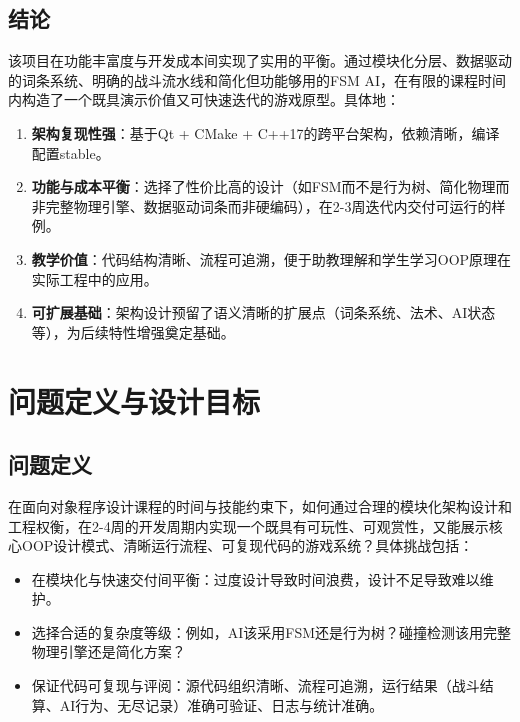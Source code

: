 ﻿\documentclass[utf8]{ctexart}
\begin{document}
\subsection{结论}

该项目在功能丰富度与开发成本间实现了实用的平衡。通过模块化分层、数据驱动的词条系统、明确的战斗流水线和简化但功能够用的FSM AI，在有限的课程时间内构造了一个既具演示价值又可快速迭代的游戏原型。具体地：

\begin{enumerate}
  \item \textbf{架构复现性强}：基于Qt + CMake + C++17的跨平台架构，依赖清晰，编译配置stable。

  \item \textbf{功能与成本平衡}：选择了性价比高的设计（如FSM而不是行为树、简化物理而非完整物理引擎、数据驱动词条而非硬编码），在2-3周迭代内交付可运行的样例。

  \item \textbf{教学价值}：代码结构清晰、流程可追溯，便于助教理解和学生学习OOP原理在实际工程中的应用。

  \item \textbf{可扩展基础}：架构设计预留了语义清晰的扩展点（词条系统、法术、AI状态等），为后续特性增强奠定基础。
\end{enumerate}

\section{问题定义与设计目标}

\subsection{问题定义}

在面向对象程序设计课程的时间与技能约束下，如何通过合理的模块化架构设计和工程权衡，在2-4周的开发周期内实现一个既具有可玩性、可观赏性，又能展示核心OOP设计模式、清晰运行流程、可复现代码的游戏系统？具体挑战包括：

\begin{itemize}
  \item 在模块化与快速交付间平衡：过度设计导致时间浪费，设计不足导致难以维护。
  \item 选择合适的复杂度等级：例如，AI该采用FSM还是行为树？碰撞检测该用完整物理引擎还是简化方案？
  \item 保证代码可复现与评阅：源代码组织清晰、流程可追溯，运行结果（战斗结算、AI行为、无尽记录）准确可验证、日志与统计准确。
\end{itemize}
\end{document}
